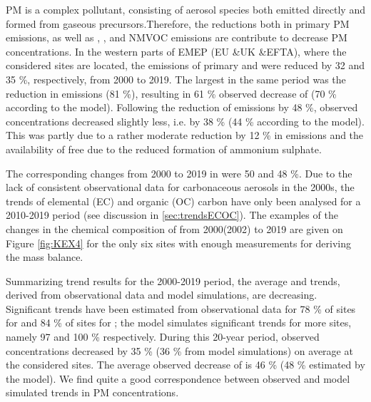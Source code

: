 PM is a complex pollutant, consisting of aerosol species both emitted
directly and formed from gaseous precursors.Therefore, the reductions both in primary PM emissions, as well as \sox, \noii, \nhiii and NMVOC emissions are contribute to decrease PM concentrations. In the western parts of EMEP (EU \&UK \&EFTA), where the considered sites are located, the emissions of primary \PM[10] and \PM[2.5] were reduced by 32 and 35 \%, respectively, from 2000 to 2019. The largest in the same period was the reduction in \sox emissions (81 \%), resulting in 61 \% observed decrease of \soiv (70 \% according to the model). Following the reduction of \noii emissions by 48 \%, observed \noiii concentrations decreased slightly less, i.e. by 38 \% (44 \% according to the model). This was partly due to a rather moderate reduction by 12 \% in \nhiii emissions and the availability of free \nhiii due to the reduced formation of ammonium sulphate. 

 The corresponding changes from 2000 to 2019 in \nhiv were 50 and 48 \%. Due to the lack of consistent observational data for carbonaceous aerosols in the 2000s, the trends of elemental (EC) and organic (OC) carbon have only been analysed for a 2010-2019 period (see discussion in \ref{sec:trendsECOC}). The examples of the changes in the chemical composition of \PM[2.5] from 2000(2002) to 2019 are given on Figure \ref{fig:KEX4} for the only six sites with enough measurements for deriving the mass balance. 

Summarizing trend results for the 2000-2019 period, the average \PM[10] and \PM[2.5] trends, derived from observational data and model simulations, are decreasing. Significant trends have been estimated from observational data for 78 \% of sites for \PM[10] and 84 \% of sites for \PM[2.5]; the model simulates significant trends for more sites, namely 97 and 100 \% respectively. During this 20-year period, observed \PM[10] concentrations decreased by 35 \%  (36 \% from model simulations) on average at the considered sites. The average observed decrease of \PM[2.5] is 46 \%  (48 \% estimated by the model). We find quite a good correspondence between observed and model simulated trends in PM concentrations. 



